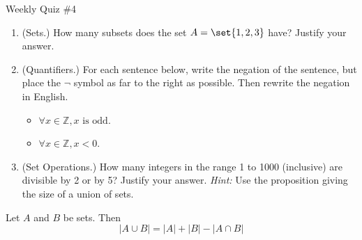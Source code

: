 \documentclass[10pt]{beamer}
\begin{document}
\begin{frame}{Weekly Quiz \#4}

\begin{enumerate}
	\item (Sets.) How many subsets does the set $A=\set{1,2,3}$ have? Justify your answer.
	\item (Quantifiers.) For each sentence below, write the negation of the sentence, but place the $\lnot$ symbol as far to the right as possible. Then rewrite the negation in English.
    \begin{itemize}    
        \item[a.] $\forall x \in \mathbb{Z}, x \text{ is odd.}$
        \item[b.] $\forall x \in \mathbb{Z}, x<0.$  
  	\end{itemize}
  	\item (Set Operations.)  How many integers in the range 1 to 1000 (inclusive) are divisible by 2 or by 5?  Justify your answer.  \textit{Hint:} Use the proposition giving the size of a union of sets.
\end{enumerate}
\vfill 
\begin{mygreenbox}[title=Proposition: Size of a Union]
Let $A$ and $B$ be sets.  Then
\[|A \cup B|  = |A| + |B| - |A \cap B| \]
\end{mygreenbox}
\end{frame}



\end{document}
